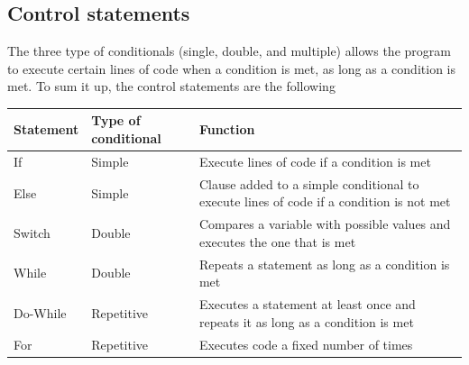 \documentclass[11pt, letterpaper, english]{article}
\begin{document}
\subsection{Control statements}
\par{The three type of conditionals (single, double, and multiple) allows the program to execute certain lines of code when a condition is met, as long as a condition is met. To sum it up, the control statements are the following}

\begin{center}
\begin{tabular}{ | m{3cm} | m{4cm}| m{9.2cm} | } 
\hline
Statement & Type of conditional & Function \\\hline
If & Simple & Execute lines of code if a condition is met \\\hline
Else & Simple & Clause added to a simple conditional to execute lines of code if a condition is not met \\\hline
Switch & Double & Compares a variable with possible values and executes the one that is met \\\hline
While & Double & Repeats a statement as long as a condition is met \\\hline
Do-While & Repetitive & Executes a statement at least once and repeats it as long as a condition is met \\\hline
For & Repetitive & Executes code a fixed number of times\\\hline
\end{tabular}
\end{center}


\newpage 



\end{document}
